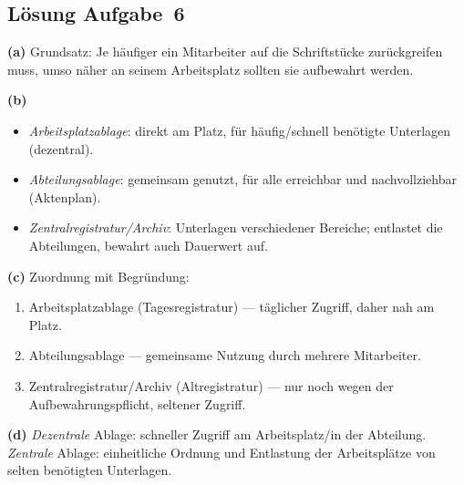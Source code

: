 \documentclass[11pt, a4paper]{article}
\begin{document}
\subsection*{Lösung Aufgabe~6}
\begin{loesung}
\textbf{(a)} Grundsatz: Je häufiger ein Mitarbeiter auf die Schriftstücke zurückgreifen
muss, umso näher an seinem Arbeitsplatz sollten sie aufbewahrt werden.

\textbf{(b)}
\begin{itemize}[itemsep=0pt]
  \item \emph{Arbeitsplatzablage}: direkt am Platz, für häufig/schnell benötigte Unterlagen (dezentral).
  \item \emph{Abteilungsablage}: gemeinsam genutzt, für alle erreichbar und nachvollziehbar (Aktenplan).
  \item \emph{Zentralregistratur/Archiv}: Unterlagen verschiedener Bereiche; entlastet die Abteilungen, bewahrt auch Dauerwert auf.
\end{itemize}

\textbf{(c)} Zuordnung mit Begründung:
\begin{enumerate}[label=\arabic*., itemsep=0pt]
  \item Arbeitsplatzablage (Tagesregistratur) --- täglicher Zugriff, daher nah am Platz.
  \item Abteilungsablage --- gemeinsame Nutzung durch mehrere Mitarbeiter.
  \item Zentralregistratur/Archiv (Altregistratur) --- nur noch wegen der Aufbewahrungspflicht, seltener Zugriff.
\end{enumerate}

\textbf{(d)} \emph{Dezentrale} Ablage: schneller Zugriff am Arbeitsplatz/in der Abteilung.
\emph{Zentrale} Ablage: einheitliche Ordnung und Entlastung der Arbeitsplätze von selten
benötigten Unterlagen.
\end{loesung}
\end{document}
